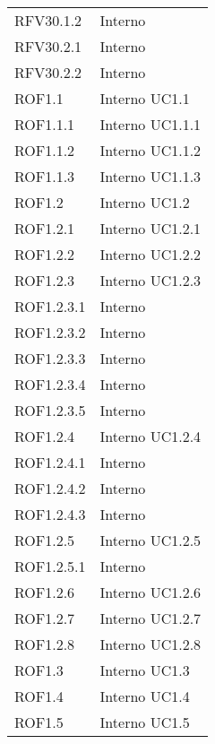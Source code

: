 \begin{longtable}{p{2.5cm}!{\VRule[1pt]}p{2.5cm}}
RFV30.1.2 & Interno \\
RFV30.2.1 & Interno \\
RFV30.2.2 & Interno \\
ROF1.1 & Interno \newline UC1.1
 \\
ROF1.1.1 & Interno \newline UC1.1.1
 \\
ROF1.1.2 & Interno \newline UC1.1.2
 \\
ROF1.1.3 & Interno \newline UC1.1.3
 \\
ROF1.2 & Interno \newline UC1.2
 \\
ROF1.2.1 & Interno \newline UC1.2.1
 \\
ROF1.2.2 & Interno \newline UC1.2.2
 \\
ROF1.2.3 & Interno \newline UC1.2.3
 \\
ROF1.2.3.1 & Interno \\
ROF1.2.3.2 & Interno \\
ROF1.2.3.3 & Interno \\
ROF1.2.3.4 & Interno \\
ROF1.2.3.5 & Interno \\
ROF1.2.4 & Interno \newline UC1.2.4
 \\
ROF1.2.4.1 & Interno \\
ROF1.2.4.2 & Interno \\
ROF1.2.4.3 & Interno \\
ROF1.2.5 & Interno \newline UC1.2.5
 \\
ROF1.2.5.1 & Interno \\
ROF1.2.6 & Interno \newline UC1.2.6
 \\
ROF1.2.7 & Interno \newline UC1.2.7
 \\
ROF1.2.8 & Interno \newline UC1.2.8
 \\
ROF1.3 & Interno \newline UC1.3
 \\
ROF1.4 & Interno \newline UC1.4
 \\
ROF1.5 & Interno \newline UC1.5

\end{longtable}
